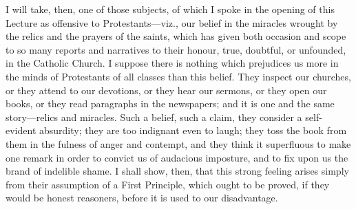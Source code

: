 I will take, then, one of those subjects, of which I
spoke in the opening of this Lecture as offensive to
Protestants—viz., our belief in the miracles wrought
by the relics and the prayers of the saints, which has
given both occasion and scope to so many reports and
narratives to their honour, true, doubtful, or unfounded,
in the Catholic Church. I suppose there is nothing which
prejudices us more in the minds of Protestants of all
classes than this belief. They inspect our churches, or
they attend to our devotions, or they hear our sermons,
or they open our books, or they read paragraphs in the
newspapers; and it is one and the same story—relics
and miracles. Such a belief, such a claim, they consider
a self-evident absurdity; they are too indignant even to
laugh; they toss the book from them in the fulness of
anger and contempt, and they think it superfluous to make
one remark in order to convict us of audacious imposture,
and to fix upon us the brand of indelible shame. I shall
show, then, that this strong feeling arises simply from
their assumption of a First Principle, which ought to be
proved, if they would be honest reasoners, before it is
used to our disadvantage.


